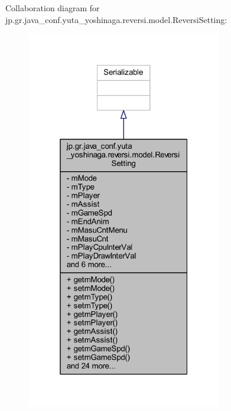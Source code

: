 Collaboration diagram for jp.\+gr.\+java\+\_\+conf.\+yuta\+\_\+yoshinaga.\+reversi.\+model.\+Reversi\+Setting\+:
\nopagebreak
\begin{figure}[H]
\begin{center}
\leavevmode
\includegraphics[width=241pt]{classjp_1_1gr_1_1java__conf_1_1yuta__yoshinaga_1_1reversi_1_1model_1_1_reversi_setting__coll__graph}
\end{center}
\end{figure}
